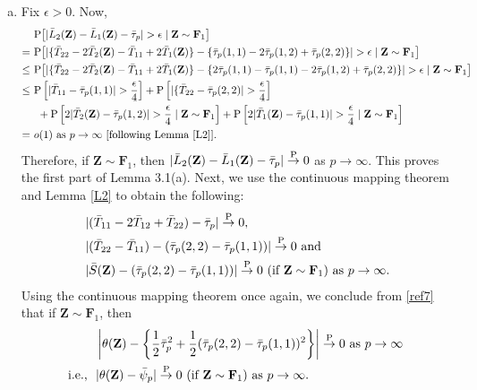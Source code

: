 \documentclass[twoside]{article}
\newcommand{\bZ}{\mathbf{Z}}
\newcommand{\bF}{\mathbf{F}}
\newcommand{\0}{\mathbf{0}}
\newcommand{\1}{\mathbf{1}}
\numberwithin{equation}{section}
\begin{document}
\begin{enumerate}[(a)]
 \item Fix $\epsilon >0.$ Now,
\begin{align}\label{ref4}
 &\ {\rm P}\big [|\bar{L}_2(\bZ)- \bar{L}_1(\bZ) - \bar{\tau}_p|>\epsilon\mid \bZ\sim\bF_1\big ]\nonumber \\
 =&\ {\rm P}\big [|\{\bar{T}_{22} - 2\bar{T}_2(\bZ)- \bar{T}_{11} + 2\bar{T}_1(\bZ)\}
 - \{\bar{\tau}_p(1,1) - 2\bar{\tau}_p(1,2) +\bar{\tau}_p(2,2)\}|>\epsilon\mid \bZ\sim\bF_1\big ]\nonumber \\
 \leq &\ {\rm P}\big [|\{\bar{T}_{22} - 2\bar{T}_2(\bZ)- \bar{T}_{11} + 2\bar{T}_1(\bZ)\}- \{2\bar{\tau}_p(1,1) -\bar{\tau}_p(1,1) - 2\bar{\tau}_p(1,2) +\bar{\tau}_p(2,2)\}|>\epsilon\mid \bZ\sim\bF_1\big ]\nonumber \\
 \leq &\ {\rm P}\left [|\bar{T}_{11}-\bar{\tau}_p(1,1)|>\frac{\epsilon}{4}\right ] + {\rm P}\left [|\{\bar{T}_{22} - \bar{\tau}_p(2,2)|>\frac{\epsilon}{4}\right ]\nonumber \\
 &\ \ + {\rm P}\left [2|\bar{T}_2(\bZ)- \bar{\tau}_p(1,2)|>\frac{\epsilon}{4}\mid \bZ\sim\bF_1\right ]+ {\rm P}\left [2|\bar{T}_1(\bZ) - \bar{\tau}_p(1,1)|>\frac{\epsilon}{4}\mid \bZ\sim\bF_1\right ]\nonumber \\
 =&\ o(1)\text{ as }p\to\infty\ [\text{following Lemma \ref{L2}}].
\end{align}
Therefore, if $\bZ\sim\bF_1$, then $|\bar{L}_2(\bZ)- \bar{L}_1(\bZ) - \bar{\tau}_p|\stackrel{\rm P}{\to}0$ as $p\to\infty$. This proves the first part of Lemma 3.1(a).
Next, we use the continuous mapping theorem and Lemma \ref{L2} to obtain the following:
\begin{align*}
 &\ |(\bar{T}_{11}-2\bar{T}_{12}+\bar{T}_{22})- \bar{\tau}_p|\stackrel{\rm P}{\to}0,\\
 &\ |(\bar{T}_{22}-\bar{T}_{11})- (\bar{\tau}_p(2,2)-\bar{\tau}_p(1,1))|\stackrel{\rm P}{\to}0\text{ and }\\
 &\ |\bar{S}(\bZ)-(\bar{\tau}_p(2,2)-\bar{\tau}_p(1,1))|\stackrel{\rm P}{\to}0\ (\text{if }\bZ\sim\bF_1)\text{ as }p\to\infty.
\end{align*}
Using the continuous mapping theorem once again, we conclude from \eqref{ref7} that if $\bZ\sim\bF_1$, then
\begin{align}\label{ref8}
 &\ \left |\theta(\bZ) - \left \{\frac{1}{2}\bar{\tau}_p^2 + \frac{1}{2}(\bar{\tau}_p(2,2)-\bar{\tau}_p(1,1))^2\right \}\right |\stackrel{\rm P}{\to}0\text{ as }p\to\infty\nonumber \\
 \text{i.e., }&\ |\theta(\bZ) - \bar{\psi}_p|\stackrel{\rm P}{\to}0\ (\text{if }\bZ\sim\bF_1)\text{ as }p\to\infty.
\end{align}


\end{enumerate}
\end{document}
